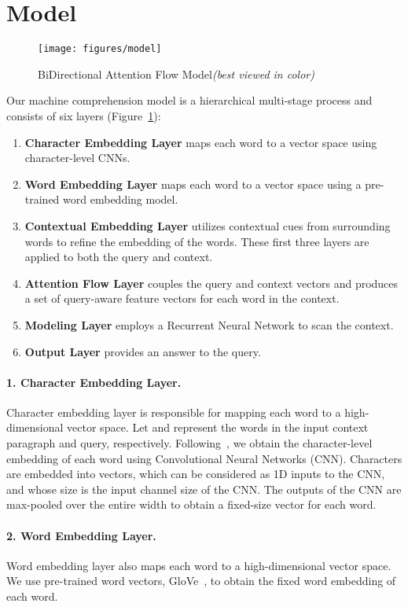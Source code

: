\documentclass{article} \usepackage{iclr2017_conference,times}
\begin{document}
\section{Model}\label{sec:model}

\begin{figure}[t]
\centering
\texttt{[image: figures/model]}
\caption{\small BiDirectional Attention Flow Model\space\space \textit{(best viewed in color)}}
\label{fig:model}
\end{figure}
Our machine comprehension model is a hierarchical multi-stage process and consists of six layers (Figure~\ref{fig:model}): 
\begin{enumerate}
    \item \textbf{Character Embedding Layer} maps each word to a vector space using character-level CNNs. \item \textbf{Word Embedding Layer} maps each word to a vector space using a pre-trained word embedding model. \item \textbf{Contextual Embedding Layer} utilizes contextual cues from surrounding words to refine the embedding of the words. These first three layers are applied to both the query and context.
    \item \textbf{Attention Flow Layer} couples the query and context vectors and produces a set of query-aware feature vectors for each word in the context.
    \item \textbf{Modeling Layer} employs a Recurrent Neural Network to scan the context.\item \textbf{Output Layer} provides an answer to the query.\end{enumerate}

\paragraph{1. Character Embedding Layer.}\label{subsec:char}
Character embedding layer is responsible for mapping each word to a high-dimensional vector space. Let  and  represent the words in the input context paragraph and query, respectively.
Following~\cite{char-cnn}, we obtain the character-level embedding of each word using Convolutional Neural Networks (CNN). Characters are embedded into vectors, which can be considered as 1D inputs to the CNN, and whose size is the input channel size of the CNN. The outputs of the CNN are max-pooled over the entire width to obtain a fixed-size vector for each word.  

\paragraph{2. Word Embedding Layer.}\label{subsec:emb}
Word embedding layer also maps each word to a high-dimensional vector space. We use pre-trained word vectors, GloVe~\citep{glove}, to obtain the fixed word embedding of each word.
\end{document}
